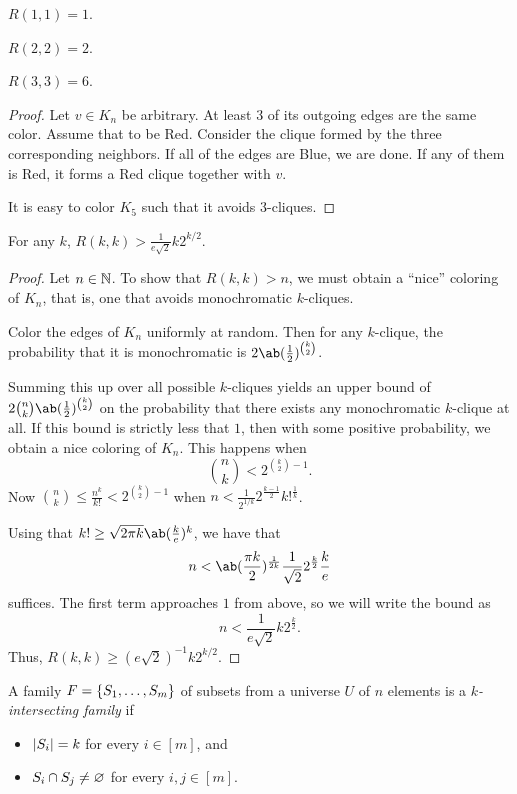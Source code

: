 \begin{examples}
    \item $R(1, 1) = 1$.
    \item $R(2, 2) = 2$.
    \item $R(3, 3) = 6$.
    \begin{proof}
        Let $v \in K_n$ be arbitrary.
        At least $3$ of its outgoing edges are the same color.
        Assume that to be Red.
        Consider the clique formed by the three corresponding neighbors.
        If all of the edges are Blue, we are done.
        If any of them is Red, it forms a Red clique together with $v$.

        It is easy to color $K_5$ such that it avoids $3$-cliques.
    \end{proof}
\end{examples}

\begin{theorem} \label{thm:ramsey1}
    For any $k$, $R(k, k) > \frac1{e\sqrt 2} k 2^{k/2}$.
\end{theorem}
\begin{proof}
    Let $n \in \mathbb{N}$.
    To show that $R(k, k) > n$, we must obtain a ``nice'' coloring of
    $K_n$, that is, one that avoids monochromatic $k$-cliques.

    Color the edges of $K_n$ uniformly at random.
    Then for any $k$-clique, the probability that it is monochromatic is
    $2 \ab(\frac12)^{\binom{k}{2}}$.

    Summing this up over all possible $k$-cliques yields an upper bound of
    $2 \binom{n}{k} \ab(\frac12)^{\binom{k}{2}}$ on the probability that
    there exists any monochromatic $k$-clique at all.
    If this bound is strictly less that $1$, then with some positive
    probability, we obtain a nice coloring of $K_n$.
    This happens when \[
        \binom{n}{k} < 2^{\binom{k}{2} - 1}.
    \] Now $\binom{n}{k} \le \frac{n^k}{k!} < 2^{\binom{k}{2} - 1}$ when
    $n < \frac1{2^{1 / k}} 2^{\frac{k - 1}{2}} k!^{\frac1k}$.

    Using that $k! \ge \sqrt{2 \pi k} \ab(\frac ke)^k$, we have that \[
        n < \ab(\frac{\pi k}{2})^{\frac1{2k}} \frac1{\sqrt 2} 2^{\frac k2} \frac ke
    \] suffices.
    The first term approaches $1$ from above, so we will write the bound as
    \[
        n < \frac1{e \sqrt 2} k 2^{\frac k2}.
    \]
    Thus, $R(k, k) \ge (e \sqrt 2)^{-1} k 2^{k/2}$.
\end{proof}

\begin{definition} \label{def:intersecting-family}
    A family $F = \{S_1, \dots, S_m\}$ of subsets from a universe $U$ of
    $n$ elements is a \emph{$k$-intersecting family} if
    \begin{itemize}
        \item $\lvert S_i\rvert = k$ for every $i \in [m]$, and
        \item $S_i \cap S_j \ne \varnothing$ for every $i, j \in [m]$.
    \end{itemize}
\end{definition}

